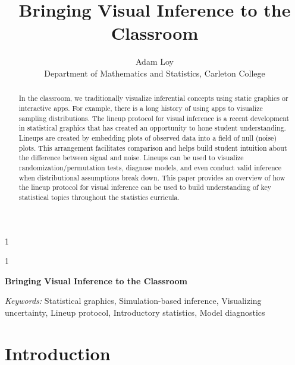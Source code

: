 \documentclass[12pt]{article}
\newcommand{\blind}{1}
\begin{document}
\def\spacingset#1{\renewcommand{\baselinestretch}%
{#1}\small\normalsize} \spacingset{1}



\blind
{
  \title{\bf Bringing Visual Inference to the Classroom}

  \author{
        Adam Loy \\
    Department of Mathematics and Statistics, Carleton College\\
      }
  \maketitle
} \fi

\blind
{
  \bigskip
  \bigskip
  \bigskip
  \begin{center}
    {\LARGE\bf Bringing Visual Inference to the Classroom}
  \end{center}
  \medskip
} \fi

\bigskip
\begin{abstract}
In the classroom, we traditionally visualize inferential concepts using
static graphics or interactive apps. For example, there is a long
history of using apps to visualize sampling distributions. The lineup
protocol for visual inference is a recent development in statistical
graphics that has created an opportunity to hone student understanding.
Lineups are created by embedding plots of observed data into a field of
null (noise) plots. This arrangement facilitates comparison and helps
build student intuition about the difference between signal and noise.
Lineups can be used to visualize randomization/permutation tests,
diagnose models, and even conduct valid inference when distributional
assumptions break down. This paper provides an overview of how the
lineup protocol for visual inference can be used to build understanding
of key statistical topics throughout the statistics curricula.
\end{abstract}

\noindent%
{\it Keywords:} Statistical graphics, Simulation-based
inference, Visualizing uncertainty, Lineup protocol, Introductory
statistics, Model diagnostics
\vfill

\newpage
\spacingset{1.45} %

\hypertarget{introduction}{%
\section{Introduction}\label{introduction}}
\end{document}
